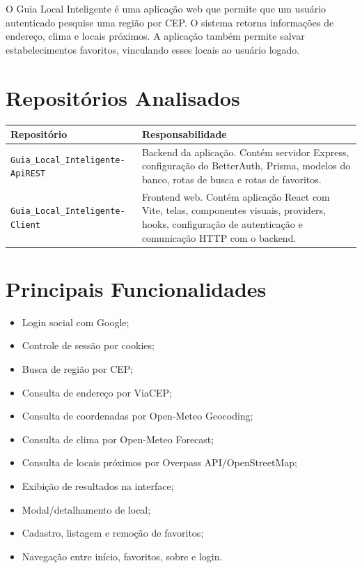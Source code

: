 \documentclass[
    12pt,
    oneside,
    openright,
    a4paper,
    english,
    brazil
]{abntex2}
\begin{document}
O Guia Local Inteligente é uma aplicação web que permite que um usuário autenticado pesquise uma região por CEP. O sistema retorna informações de endereço, clima e locais próximos. A aplicação também permite salvar estabelecimentos favoritos, vinculando esses locais ao usuário logado.

\section{Repositórios Analisados}

\begin{longtable}{|p{4cm}|p{10cm}|}
\hline
\textbf{Repositório} & \textbf{Responsabilidade} \\
\hline
\texttt{Guia\_Local\_Inteligente-ApiREST} & Backend da aplicação. Contém servidor Express, configuração do BetterAuth, Prisma, modelos do banco, rotas de busca e rotas de favoritos. \\
\hline
\texttt{Guia\_Local\_Inteligente-Client} & Frontend web. Contém aplicação React com Vite, telas, componentes visuais, providers, hooks, configuração de autenticação e comunicação HTTP com o backend. \\
\hline
\end{longtable}

\section{Principais Funcionalidades}

\begin{itemize}
    \item Login social com Google;
    \item Controle de sessão por cookies;
    \item Busca de região por CEP;
    \item Consulta de endereço por ViaCEP;
    \item Consulta de coordenadas por Open-Meteo Geocoding;
    \item Consulta de clima por Open-Meteo Forecast;
    \item Consulta de locais próximos por Overpass API/OpenStreetMap;
    \item Exibição de resultados na interface;
    \item Modal/detalhamento de local;
    \item Cadastro, listagem e remoção de favoritos;
    \item Navegação entre início, favoritos, sobre e login.
\end{itemize}
\end{document}
